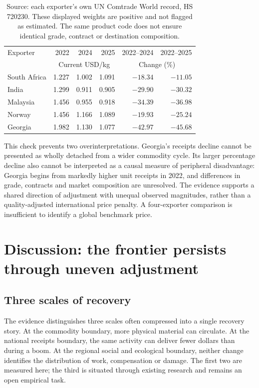 \documentclass[11pt,a4paper]{article}
\begin{document}
\begin{table}[htbp]\centering\small
\caption{Unit export receipts in Georgia and four established exporters.}\label{tab:reference}
\begin{tabular}{lrrrrr}\toprule
Exporter & 2022 & 2024 & 2025 & 2022--2024 & 2022--2025\\
 & \multicolumn{3}{c}{Current USD/kg} & \multicolumn{2}{c}{Change (\%)}\\\midrule
South Africa &1.227&1.002&1.091&$-18.34$&$-11.05$\\
India &1.299&0.911&0.905&$-29.90$&$-30.32$\\
Malaysia &1.456&0.955&0.918&$-34.39$&$-36.98$\\
Norway &1.456&1.166&1.089&$-19.93$&$-25.24$\\
Georgia &1.982&1.130&1.077&$-42.97$&$-45.68$\\\bottomrule
\end{tabular}
\caption*{Source: each exporter's own UN Comtrade World record, HS 720230. These displayed weights are positive and not flagged as estimated. The same product code does not ensure identical grade, contract or destination composition.}
\end{table}

This check prevents two overinterpretations. Georgia's receipts decline cannot be presented as wholly detached from a wider commodity cycle. Its larger percentage decline also cannot be interpreted as a causal measure of peripheral disadvantage: Georgia begins from markedly higher unit receipts in 2022, and differences in grade, contracts and market composition are unresolved. The evidence supports a shared direction of adjustment with unequal observed magnitudes, rather than a quality-adjusted international price penalty. A four-exporter comparison is insufficient to identify a global benchmark price.

\section{Discussion: the frontier persists through uneven adjustment}
\subsection{Three scales of recovery}
The evidence distinguishes three scales often compressed into a single recovery story. At the commodity boundary, more physical material can circulate. At the national receipts boundary, the same activity can deliver fewer dollars than during a boom. At the regional social and ecological boundary, neither change identifies the distribution of work, compensation or damage. The first two are measured here; the third is situated through existing research and remains an open empirical task.
\end{document}
